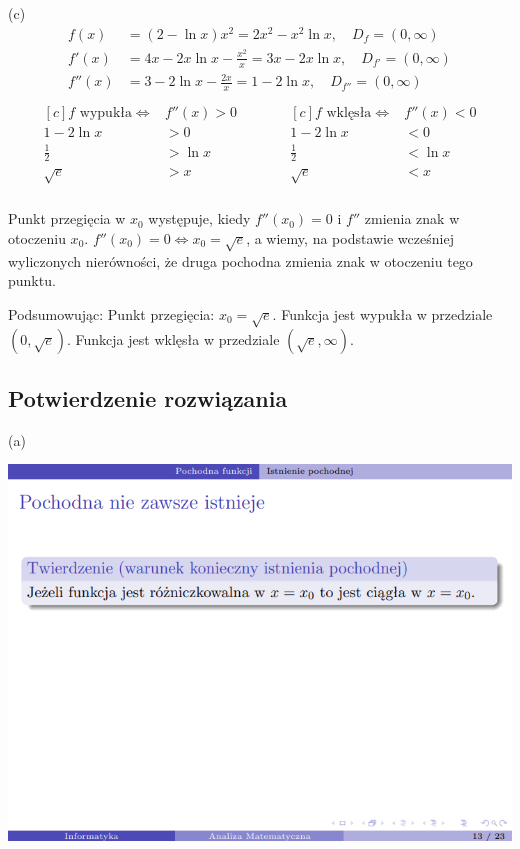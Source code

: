 \documentclass[12pt]{article}
\begin{document}
(c)
\begin{align*}
    f(x) &= (2-\ln x)x^2 = 2x^2 - x^2\ln x, \quad D_{f} = (0,\infty) \\
    f'(x) &= 4x - 2x\ln x - \frac{x^2}{x} = 3x - 2x \ln x, \quad D_{f'} = (0,\infty) \\
    f''(x) &= 3 - 2 \ln x - \frac{2x}{x} = 1 - 2 \ln x, \quad D_{f''} = (0,\infty) \\
\end{align*}
\begin{align*}
\begin{aligned}[c]
    f \text{  wypukła} \iff& f''(x) > 0 \\
    1-2\ln x &> 0 \\ 
    \frac{1}{2} &> \ln x \\
    \sqrt{e} &> x
\end{aligned}
\quad\quad\quad
\begin{aligned}[c]
    f \text{  wklęsła} \iff& f''(x) < 0 \\
    1-2\ln x &< 0 \\ 
    \frac{1}{2} &< \ln x \\
    \sqrt{e} &< x
\end{aligned} \\
\end{align*}

Punkt przegięcia w $x_0$ występuje, kiedy $f''(x_0) = 0$ i $f''$ zmienia znak w otoczeniu $x_0$. $f''(x_0) = 0 \iff x_0 = \sqrt{e}$, a wiemy, na podstawie wcześniej wyliczonych nierówności, że druga pochodna zmienia znak w otoczeniu tego punktu.

Podsumowując:
Punkt przegięcia: $x_0 = \sqrt{e}$.
Funkcja jest wypukła w przedziale $(0,\sqrt{e})$.
Funkcja jest wklęsła w przedziale $(\sqrt{e}, \infty)$.

\subsection{Potwierdzenie rozwiązania}
(a)

\includegraphics[scale=0.5]{am_1_a.png}
\end{document}
